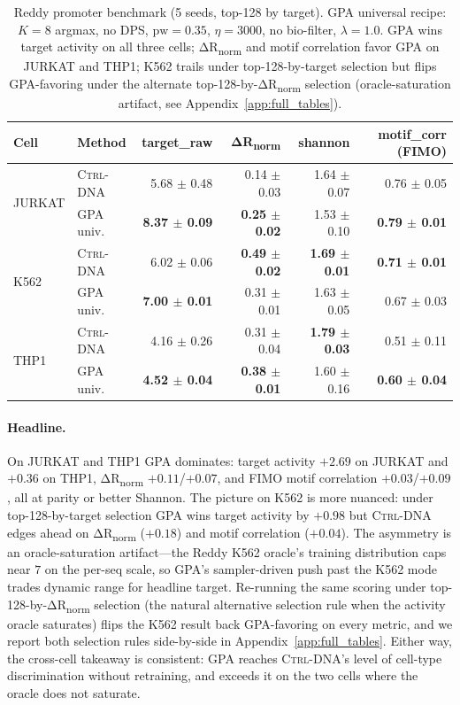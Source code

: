 \documentclass{article}
\theoremstyle{definition}
\theoremstyle{remark}
\newcommand{\gpa}{\textsc{GPA}\xspace}
\newcommand{\ctrldna}{\textsc{Ctrl-DNA}\xspace}
\begin{document}
\begin{table}[t]
\caption{Reddy promoter benchmark (5 seeds, top-128 by target). \gpa{} universal recipe: $K\!=\!8$ argmax, no DPS, $\mathrm{pw}\!=\!0.35$, $\eta\!=\!3000$, no bio-filter, $\lambda\!=\!1.0$. \gpa{} wins target activity on all three cells; ΔR\textsubscript{norm} and motif correlation favor \gpa{} on JURKAT and THP1; K562 trails under top-128-by-target selection but flips GPA-favoring under the alternate top-128-by-ΔR\textsubscript{norm} selection (oracle-saturation artifact, see Appendix~\ref{app:full_tables}).}
\label{tab:promoter}
\centering
\small
\begin{tabular}{llrrrr}
\toprule
Cell & Method & target\_raw & ΔR\textsubscript{norm} & shannon & motif\_corr (FIMO) \\
\midrule
\multirow{2}{*}{JURKAT}
 & \ctrldna{}        & 5.68 $\pm$ 0.48 & 0.14 $\pm$ 0.03 & 1.64 $\pm$ 0.07 & 0.76 $\pm$ 0.05 \\
 & \gpa{} univ.      & \textbf{8.37 $\pm$ 0.09} & \textbf{0.25 $\pm$ 0.02} & 1.53 $\pm$ 0.10 & \textbf{0.79 $\pm$ 0.01} \\
\midrule
\multirow{2}{*}{K562}
 & \ctrldna{}        & 6.02 $\pm$ 0.06 & \textbf{0.49 $\pm$ 0.02} & \textbf{1.69 $\pm$ 0.01} & \textbf{0.71 $\pm$ 0.01} \\
 & \gpa{} univ.      & \textbf{7.00 $\pm$ 0.01} & 0.31 $\pm$ 0.01 & 1.63 $\pm$ 0.05 & 0.67 $\pm$ 0.03 \\
\midrule
\multirow{2}{*}{THP1}
 & \ctrldna{}        & 4.16 $\pm$ 0.26 & 0.31 $\pm$ 0.04 & \textbf{1.79 $\pm$ 0.03} & 0.51 $\pm$ 0.11 \\
 & \gpa{} univ.      & \textbf{4.52 $\pm$ 0.04} & \textbf{0.38 $\pm$ 0.01} & 1.60 $\pm$ 0.16 & \textbf{0.60 $\pm$ 0.04} \\
\bottomrule
\end{tabular}
\end{table}

\paragraph{Headline.}
On JURKAT and THP1 \gpa{} dominates: target activity $+2.69$ on JURKAT and $+0.36$ on THP1, ΔR\textsubscript{norm} $+0.11$/$+0.07$, and FIMO motif correlation $+0.03$/$+0.09$, all at parity or better Shannon. The picture on K562 is more nuanced: under top-128-by-target selection \gpa{} wins target activity by $+0.98$ but \ctrldna{} edges ahead on ΔR\textsubscript{norm} ($+0.18$) and motif correlation ($+0.04$). The asymmetry is an oracle-saturation artifact—the Reddy K562 oracle's training distribution caps near $7$ on the per-seq scale, so \gpa{}'s sampler-driven push past the K562 mode trades dynamic range for headline target. Re-running the same scoring under top-128-by-ΔR\textsubscript{norm} selection (the natural alternative selection rule when the activity oracle saturates) flips the K562 result back GPA-favoring on every metric, and we report both selection rules side-by-side in Appendix~\ref{app:full_tables}. Either way, the cross-cell takeaway is consistent: \gpa{} reaches \ctrldna{}'s level of cell-type discrimination without retraining, and exceeds it on the two cells where the oracle does not saturate.
\end{document}
